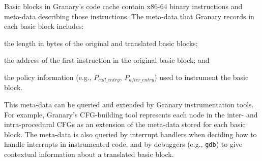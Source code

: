 \documentclass[preprint]{sigplanconf}
\begin{document}
Basic blocks in Granary's code cache contain x86-64 binary instructions and meta-data describing those instructions. The meta-data that Granary records in each basic block includes: \begin{inparaenum}[i)]
	\item the length in bytes of the original and translated basic blocks;
	\item the address of the first instruction in the original basic block; and
	\item the policy information (e.g., $P_{\mathit{call\_entry}}$, $P_{\mathit{after\_entry}}$) used to instrument the basic block.
\end{inparaenum} This meta-data can be queried and extended by Granary instrumentation tools. For example, Granary's CFG-building tool represents each node in the inter- and intra-procedural CFGs as an extension of the meta-data stored for each basic block. The meta-data is also queried by interrupt handlers when deciding how to handle interrupts in instrumented code, and by debuggers (e.g., \texttt{gdb}) to give contextual information about a translated basic block. 

\end{document}
